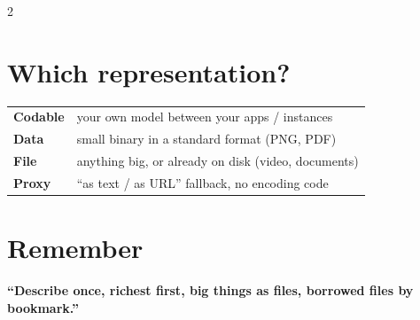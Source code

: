 \documentclass[8pt]{extarticle}
\begin{document}
\begin{multicols}{2}
\section{Which representation?}
{\footnotesize
\begin{tabular}{@{}>{\raggedright\arraybackslash}p{18mm}>{\raggedright\arraybackslash}p{54mm}@{}}
\toprule
\textbf{Codable} & your own model between your apps / instances \\
\textbf{Data} & small binary in a standard format (PNG, PDF) \\
\textbf{File} & anything big, or already on disk (video, documents) \\
\textbf{Proxy} & ``as text / as URL'' fallback, no encoding code \\
\bottomrule
\end{tabular}}

\section{Remember}
\textbf{``Describe once, richest first, big things as files, borrowed files by bookmark.''}


\end{multicols}

\end{document}
